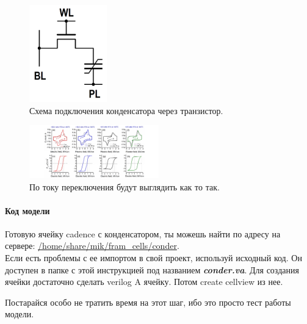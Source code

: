 \documentclass[a4paper,12pt]{article} %
\begin{document}
\begin{figure}[h]
\centering
\includegraphics[width=0.3\textwidth]{FRAM-fig1.PNG}
\caption{Схема подключения конденсатора через транзистор.}
\end{figure}



\begin{figure}[h]
\centering
\includegraphics[width=0.5\textwidth]{segneto-graph.png}
\caption{По току переключения будут выглядить как то так.}
\end{figure}


\paragraph{Код модели}

Готовую ячейку cadence с конденсатором, ты можешь найти по адресу на сервере: \url{/home/share/mik/fram_cells/conder}.\\
Если есть проблемы с ее импортом в свой проект, используй исходный код. Он доступен в папке с этой инструкцией под названием \textbf{\textit{conder.va}}. Для создания ячейки достаточно сделать verilog A ячейку. Потом create cellview из нее. 



Постарайся особо не тратить время на этот шаг, ибо это просто тест работы модели.
\end{document}
